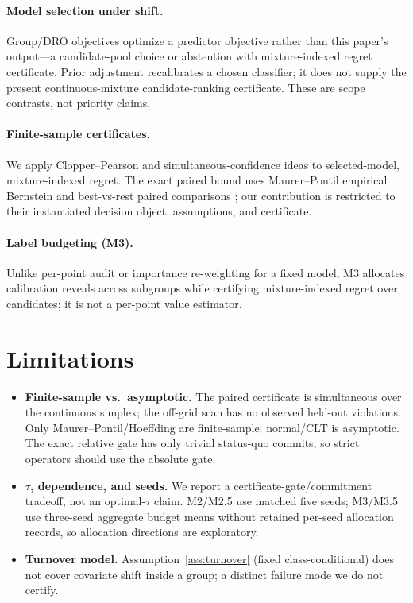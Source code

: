 \documentclass{article}
\begin{document}
\paragraph{Model selection under shift.} Group/DRO objectives \citep{sagawa2019distribution,
duchi2019sparse} optimize a predictor objective rather than this paper's output---a
candidate-pool choice or abstention with mixture-indexed regret certificate. Prior adjustment
\citep{saerens2002adjusting} recalibrates a chosen classifier; it does not supply the present
continuous-mixture candidate-ranking certificate. These are scope contrasts, not priority claims.

\paragraph{Finite-sample certificates.} We apply Clopper--Pearson and simultaneous-confidence
ideas \citep{vovk2005conformal, clopper1934inverse} to selected-model, mixture-indexed regret.
The exact paired bound uses Maurer--Pontil empirical Bernstein \citep{maurer2009bernstein} and
best-vs-rest paired comparisons \citep{dunnett1955multiple, hsu1984simultaneous}; our
contribution is restricted to their instantiated decision object, assumptions, and certificate.

\paragraph{Label budgeting (M3).} Unlike per-point audit or importance re-weighting for a
fixed model, M3 allocates calibration reveals across subgroups while certifying
mixture-indexed regret over candidates; it is not a per-point value estimator.

\section{Limitations}
\label{sec:limits}
\begin{itemize}
\item \textbf{Finite-sample vs.\ asymptotic.} The paired certificate is simultaneous over the
continuous simplex; the off-grid scan has no observed held-out violations. Only Maurer--Pontil/Hoeffding
are finite-sample; normal/CLT is asymptotic. The exact relative gate has only trivial
status-quo commits, so strict operators should use the absolute gate.
\item \textbf{$\tau$, dependence, and seeds.} We report a certificate-gate/commitment
tradeoff, not an optimal-$\tau$ claim. M2/M2.5 use matched five seeds; M3/M3.5 use three-seed
aggregate budget means without retained per-seed allocation records, so allocation directions are exploratory.
\item \textbf{Turnover model.} Assumption~\ref{ass:turnover} (fixed class-conditional) does
not cover covariate shift inside a group; a distinct failure mode we do not certify.
\end{itemize}
\end{document}
